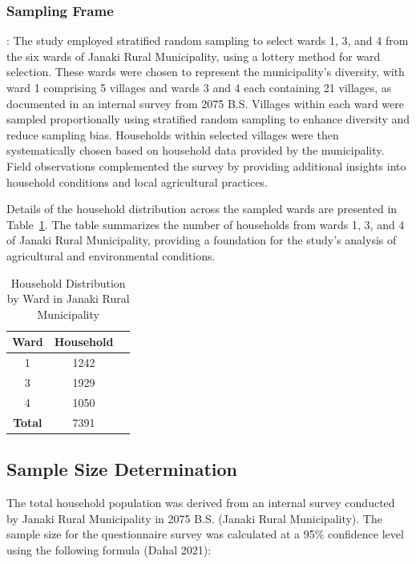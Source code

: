 \subsubsection{Sampling Frame}:
The study employed stratified random sampling to select wards 1, 3, and 4 from the six wards of Janaki Rural Municipality, using a lottery method for ward selection. These wards were chosen to represent the municipality’s diversity, with ward 1 comprising 5 villages and wards 3 and 4 each containing 21 villages, as documented in an internal survey from 2075 B.S. Villages within each ward were sampled proportionally using stratified random sampling to enhance diversity and reduce sampling bias. Households within selected villages were then systematically chosen based on household data provided by the municipality. Field observations complemented the survey by providing additional insights into household conditions and local agricultural practices.

Details of the household distribution across the sampled wards are presented in Table~\ref{tab:household_distribution}. The table summarizes the number of households from wards 1, 3, and 4 of Janaki Rural Municipality, providing a foundation for the study’s analysis of agricultural and environmental conditions.

\begin{table}[h]
\centering
\caption{Household Distribution by Ward in Janaki Rural Municipality}
\label{tab:household_distribution}

\begin{tabular}{|c|c|c|}
\hline
\textbf{Ward} & \textbf{Household}  \\ \hline
1 & 1242  \\ \hline
3 & 1929  \\ \hline
4 & 1050 \\ \hline
\textbf{Total} & 7391 \\ \hline
\end{tabular}
\end{table}

\subsection{Sample Size Determination}  
The total household population was derived from an internal survey conducted by Janaki Rural Municipality in 2075 B.S. (Janaki Rural Municipality). The sample size for the questionnaire survey was calculated at a 95\% confidence level using the following formula (Dahal 2021):

